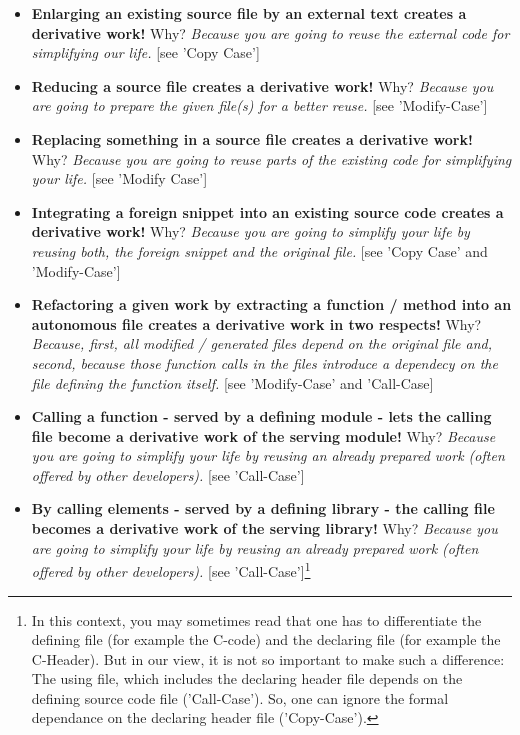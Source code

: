 {\begin{itemize}
  \item \textbf{Enlarging an existing source file by an external text creates a
  derivative work!} Why? \emph{Because you are going to reuse the
  external code for simplifying our life.} [see 'Copy Case']
  \item \textbf{Reducing a source file creates a derivative work!} Why?
  \emph{Because you are going to prepare the given file(s) for a better reuse.}
  [see 'Modify-Case']
  \item \textbf{Replacing something in a source file creates a derivative work!}
  Why? \emph{Because you are going to reuse parts of the existing code for
  simplifying your life.} [see 'Modify Case']
  \item \textbf{Integrating a foreign snippet into an existing source code
  creates a derivative work!} Why? \emph{Because you are going to simplify
  your life by reusing both, the foreign snippet and the original file.} [see
  'Copy Case' and 'Modify-Case']
  \item \textbf{Refactoring a given work by extracting a function / method into
  an autonomous file creates a derivative work in two respects!} Why?
  \emph{Because, first, all modified / generated files depend
  on the original file and, second, because those function calls in the files
  introduce a dependecy on the file defining the function itself.}
  [see 'Modify-Case' and 'Call-Case]
  \item \textbf{Calling a function - served by a defining module - lets the
  calling file become a derivative work of the serving module!} Why?
  \emph{Because you are going to simplify your life by reusing an already
  prepared work (often offered by other developers).} [see 'Call-Case']
  \item \textbf{By calling elements - served by a defining library - the
  calling file becomes a derivative work of the serving library!} Why? 
  \emph{Because you are going to simplify your life by reusing an already
  prepared work (often offered by other developers).} [see
  'Call-Case']\footnote{In this context, you may sometimes read that one has to
  differentiate the defining file (for example the C-code) and the declaring
  file (for example the C-Header). But in our view, it is not so important to
  make such a difference: The using file, which includes the declaring header
  file depends on the defining source code file ('Call-Case'). So, one can
  ignore the formal dependance on the declaring header file ('Copy-Case').}
\end{itemize}

}
